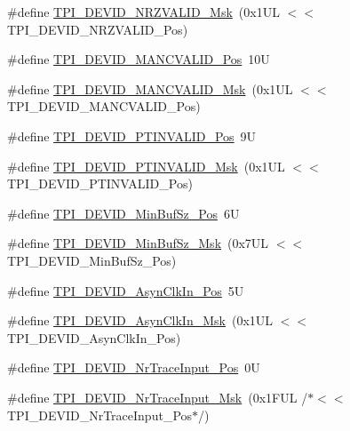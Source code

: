 \begin{DoxyCompactItemize}
\#define \hyperlink{group___c_m_s_i_s___t_p_i_gacecc8710a8f6a23a7d1d4f5674daf02a}{T\+P\+I\+\_\+\+D\+E\+V\+I\+D\+\_\+\+N\+R\+Z\+V\+A\+L\+I\+D\+\_\+\+Msk}~(0x1\+U\+L $<$$<$ T\+P\+I\+\_\+\+D\+E\+V\+I\+D\+\_\+\+N\+R\+Z\+V\+A\+L\+I\+D\+\_\+\+Pos)
\item 
\#define \hyperlink{group___c_m_s_i_s___t_p_i_ga675534579d9e25477bb38970e3ef973c}{T\+P\+I\+\_\+\+D\+E\+V\+I\+D\+\_\+\+M\+A\+N\+C\+V\+A\+L\+I\+D\+\_\+\+Pos}~10U
\item 
\#define \hyperlink{group___c_m_s_i_s___t_p_i_ga4c3ee4b1a34ad1960a6b2d6e7e0ff942}{T\+P\+I\+\_\+\+D\+E\+V\+I\+D\+\_\+\+M\+A\+N\+C\+V\+A\+L\+I\+D\+\_\+\+Msk}~(0x1\+U\+L $<$$<$ T\+P\+I\+\_\+\+D\+E\+V\+I\+D\+\_\+\+M\+A\+N\+C\+V\+A\+L\+I\+D\+\_\+\+Pos)
\item 
\#define \hyperlink{group___c_m_s_i_s___t_p_i_ga974cccf4c958b4a45cb71c7b5de39b7b}{T\+P\+I\+\_\+\+D\+E\+V\+I\+D\+\_\+\+P\+T\+I\+N\+V\+A\+L\+I\+D\+\_\+\+Pos}~9U
\item 
\#define \hyperlink{group___c_m_s_i_s___t_p_i_ga1ca84d62243e475836bba02516ba6b97}{T\+P\+I\+\_\+\+D\+E\+V\+I\+D\+\_\+\+P\+T\+I\+N\+V\+A\+L\+I\+D\+\_\+\+Msk}~(0x1\+U\+L $<$$<$ T\+P\+I\+\_\+\+D\+E\+V\+I\+D\+\_\+\+P\+T\+I\+N\+V\+A\+L\+I\+D\+\_\+\+Pos)
\item 
\#define \hyperlink{group___c_m_s_i_s___t_p_i_ga3f7da5de2a34be41a092e5eddd22ac4d}{T\+P\+I\+\_\+\+D\+E\+V\+I\+D\+\_\+\+Min\+Buf\+Sz\+\_\+\+Pos}~6U
\item 
\#define \hyperlink{group___c_m_s_i_s___t_p_i_ga939e068ff3f1a65b35187ab34a342cd8}{T\+P\+I\+\_\+\+D\+E\+V\+I\+D\+\_\+\+Min\+Buf\+Sz\+\_\+\+Msk}~(0x7\+U\+L $<$$<$ T\+P\+I\+\_\+\+D\+E\+V\+I\+D\+\_\+\+Min\+Buf\+Sz\+\_\+\+Pos)
\item 
\#define \hyperlink{group___c_m_s_i_s___t_p_i_gab382b1296b5efd057be606eb8f768df8}{T\+P\+I\+\_\+\+D\+E\+V\+I\+D\+\_\+\+Asyn\+Clk\+In\+\_\+\+Pos}~5U
\item 
\#define \hyperlink{group___c_m_s_i_s___t_p_i_gab67830557d2d10be882284275025a2d3}{T\+P\+I\+\_\+\+D\+E\+V\+I\+D\+\_\+\+Asyn\+Clk\+In\+\_\+\+Msk}~(0x1\+U\+L $<$$<$ T\+P\+I\+\_\+\+D\+E\+V\+I\+D\+\_\+\+Asyn\+Clk\+In\+\_\+\+Pos)
\item 
\#define \hyperlink{group___c_m_s_i_s___t_p_i_ga80ecae7fec479e80e583f545996868ed}{T\+P\+I\+\_\+\+D\+E\+V\+I\+D\+\_\+\+Nr\+Trace\+Input\+\_\+\+Pos}~0U
\item 
\#define \hyperlink{group___c_m_s_i_s___t_p_i_gabed454418d2140043cd65ec899abd97f}{T\+P\+I\+\_\+\+D\+E\+V\+I\+D\+\_\+\+Nr\+Trace\+Input\+\_\+\+Msk}~(0x1\+F\+U\+L /$\ast$$<$$<$ T\+P\+I\+\_\+\+D\+E\+V\+I\+D\+\_\+\+Nr\+Trace\+Input\+\_\+\+Pos$\ast$/)
$$
\end{DoxyCompactItemize}
